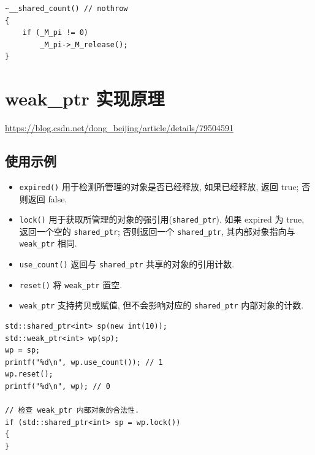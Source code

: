 \documentclass[UTF8,a4paper,12pt]{ctexbook}
\begin{document}
	\begin{lstlisting}
~__shared_count() // nothrow
{
	if (_M_pi != 0)
		_M_pi->_M_release();
}	
	\end{lstlisting}
	
\section{weak\_ptr 实现原理}
	\url{https://blog.csdn.net/dong_beijing/article/details/79504591}
	
	\subsection{使用示例}
		\begin{itemize}
			\item \verb|expired()| 用于检测所管理的对象是否已经释放, 如果已经释放, 返回 true; 否则返回 false.
			\item \verb|lock()| 用于获取所管理的对象的强引用(\verb|shared_ptr|). 如果 expired 为 true, 返回一个空的 \verb|shared_ptr|; 否则返回一个 \verb|shared_ptr|, 其内部对象指向与 \verb|weak_ptr| 相同.
			\item \verb|use_count()| 返回与 \verb|shared_ptr| 共享的对象的引用计数.
			\item \verb|reset()| 将 \verb|weak_ptr| 置空.
			\item \verb|weak_ptr| 支持拷贝或赋值, 但不会影响对应的 \verb|shared_ptr| 内部对象的计数.
		\end{itemize}
		
		\begin{lstlisting}
std::shared_ptr<int> sp(new int(10));
std::weak_ptr<int> wp(sp);
wp = sp;
printf("%d\n", wp.use_count()); // 1
wp.reset();
printf("%d\n", wp); // 0

// 检查 weak_ptr 内部对象的合法性.
if (std::shared_ptr<int> sp = wp.lock())
{
}		
		\end{lstlisting}
	
\end{document}

